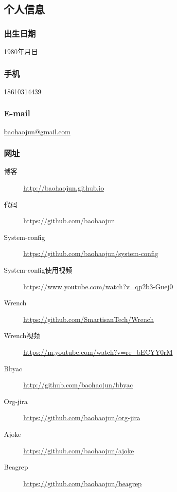 \documentclass[11pt,dvipdfmx,CJKbookmarks]{article}
\begin{document}
\begin{CJK*}{UTF8}{simsun}
\section{个人信息}
\label{sec-5}
\subsubsection{出生日期}
\label{sec-5-0-1}
1980\thinspace 年\thinspace 月\thinspace 日
\subsubsection{手机}
\label{sec-5-0-2}
18610314439
\subsubsection{E-mail}
\label{sec-5-0-3}
\href{mailto:baohaojun@gmail.com}{baohaojun@gmail.com}
\subsubsection{网址}
\label{sec-5-0-4}
\begin{description}
\item[{博客}] \url{http://baohaojun.github.io}
\item[{代码}] \url{https://github.com/baohaojun}
\item[{System-config}] \url{https://github.com/baohaojun/system-config}
\item[{System-config\thinspace 使用视频}] \url{https://www.youtube.com/watch?v=qp2b3-Guej0}
\item[{Wrench}] \url{https://github.com/SmartisanTech/Wrench}
\item[{Wrench\thinspace 视频}] \url{https://m.youtube.com/watch?v=re_bECYY0rM}
\item[{Bbyac}] \url{http://github.com/baohaojun/bbyac}
\item[{Org-jira}] \url{https://github.com/baohaojun/org-jira}
\item[{Ajoke}] \url{https://github.com/baohaojun/ajoke}
\item[{Beagrep}] \url{https://github.com/baohaojun/beagrep}
\end{description}

\end{CJK*}
\end{document}

